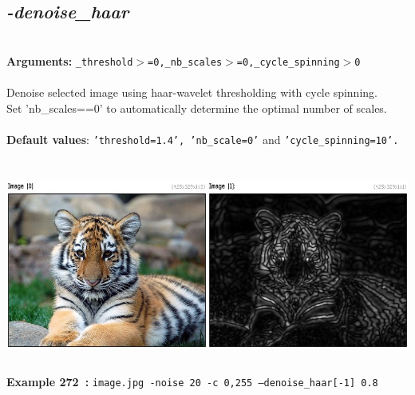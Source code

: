 \documentclass[a4paper,11pt,twoside]{book}
\begin{document}
\subsection{\emph{-denoise\_haar} }\vspace*{-0.5em}
~\\\textbf{Arguments: } 
{\small \texttt{\_threshold$>$=0,\_nb\_scales$>$=0,\_cycle\_spinning$>$0}}\\~\\
Denoise selected image using haar-wavelet thresholding with cycle spinning.
~\\Set 'nb\_scales==0' to automatically determine the optimal number of scales.
~\\~\\\textbf{Default values}: {\small \texttt{'threshold=1.4', 'nb\_scale=0'} and \texttt{'cycle\_spinning=10'.}}
\begin{center}\includegraphics[keepaspectratio=true,height=7cm,width=\textwidth]{img/gmic_def272.jpg}\\
{\footnotesize \textbf{Example 272~:} \texttt{image.jpg -noise 20 -c 0,255 --denoise\_haar[-1] 0.8}}
\end{center}
\end{document}
